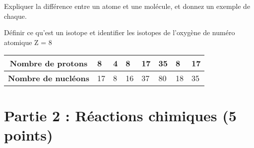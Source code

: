 \documentclass{exam}
\begin{document}
\begin{questions}
\question[0.5] Expliquer la différence entre un atome et une molécule, et donnez un exemple de chaque.

\question[1] Définir ce qu'est un isotope et identifier les isotopes de l'oxygène de numéro atomique Z = 8

\begin{table}[H]
  \centering
  \begingroup
  \renewcommand{\arraystretch}{1.5}
  \begin{tabularx}{0.6\textwidth}{|c|X|X|X|X|X|X|X|}
    \hline
    \textbf{Nombre de protons} & 8 & 4 & 8 & 17 & 35 & 8 & 17 \\
    \hline
    \textbf{Nombre de nucléons} & 17 & 8 & 16 & 37 & 80 & 18 & 35 \\
    \hline
  \end{tabularx}
  \endgroup
\end{table}

\end{questions}

\section*{Partie 2 : Réactions chimiques (5 points)}
\end{document}
